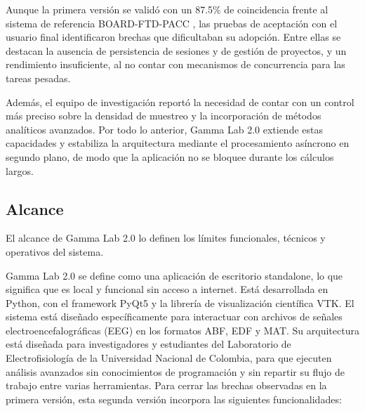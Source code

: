 \documentclass[12pt, letterpaper]{article}
\begin{document}
Aunque la primera versión se validó con un 87.5\% de coincidencia frente al sistema de referencia BOARD-FTD-PACC \cite{ref14}, las pruebas de aceptación con el usuario final identificaron brechas que dificultaban su adopción. Entre ellas se destacan la ausencia de persistencia de sesiones y de gestión de proyectos, y un rendimiento insuficiente, al no contar con mecanismos de concurrencia para las tareas pesadas.

Además, el equipo de investigación reportó la necesidad de contar con un control más preciso sobre la densidad de muestreo y la incorporación de métodos analíticos avanzados. Por todo lo anterior, Gamma Lab 2.0 extiende estas capacidades y estabiliza la arquitectura mediante el procesamiento asíncrono en segundo plano, de modo que la aplicación no se bloquee durante los cálculos largos.

\subsection{Alcance}
El alcance de Gamma Lab 2.0 lo definen los límites funcionales, técnicos y operativos del sistema.

Gamma Lab 2.0 se define como una aplicación de escritorio standalone, lo que significa que es local y funcional sin acceso a internet. Está desarrollada en Python, con el framework PyQt5 y la librería de visualización científica VTK. El sistema está diseñado específicamente para interactuar con archivos de señales electroencefalográficas (EEG) en los formatos ABF, EDF y MAT. Su arquitectura está diseñada para investigadores y estudiantes del Laboratorio de Electrofisiología de la Universidad Nacional de Colombia, para que ejecuten análisis avanzados sin conocimientos de programación y sin repartir su flujo de trabajo entre varias herramientas.
Para cerrar las brechas observadas en la primera versión, esta segunda versión incorpora las siguientes funcionalidades:
\end{document}
